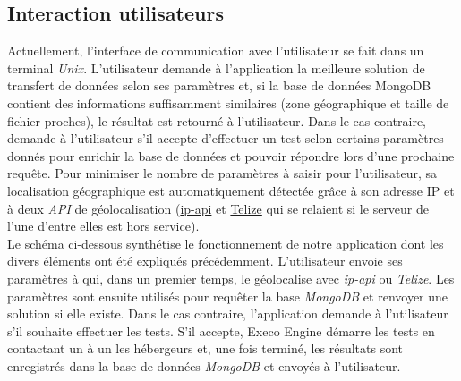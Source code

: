 \documentclass[10pt]{article}
\begin{document}
\subsection{Interaction utilisateurs}

Actuellement, l'interface de communication avec l'utilisateur se fait dans un
terminal \textit{Unix}. L'utilisateur demande à l'application la meilleure
solution de transfert de données selon ses paramètres et, si la base de données
MongoDB contient des informations suffisamment similaires (zone géographique et
taille de fichier proches), le résultat est retourné à l'utilisateur. Dans le
cas contraire, \KYD demande à l'utilisateur s'il accepte d'effectuer un
test selon certains paramètres donnés pour enrichir la base de données et
pouvoir répondre lors d'une prochaine requête. Pour minimiser le nombre de
paramètres à saisir pour l'utilisateur, sa localisation géographique est
automatiquement détectée grâce à son adresse IP et à deux \textit{API} de
géolocalisation (\href{http://ip-api.com/docs/api:json}{ip-api} et
\href{http://www.telize.com/}{Telize} qui se relaient si le serveur de l'une
d'entre elles est hors service).\\

Le schéma ci-dessous synthétise le fonctionnement de notre application dont les
divers éléments ont été expliqués précédemment. L'utilisateur envoie ses
paramètres à \KYD qui, dans un premier temps, le géolocalise avec
\textit{ip-api} ou \textit{Telize}. Les paramètres sont ensuite utilisés pour
requêter la base \textit{MongoDB} et renvoyer une solution si elle existe. Dans
le cas contraire, l'application demande à l'utilisateur s'il souhaite effectuer
les tests. S'il accepte, Execo Engine démarre les tests en contactant un à un
les hébergeurs et, une fois terminé, les résultats sont enregistrés dans la
base de données \textit{MongoDB} et envoyés à l'utilisateur.
\end{document}
